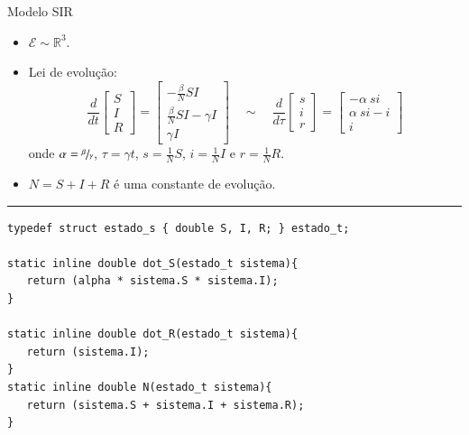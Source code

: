 \documentclass{beamer}
\begin{document}
\begin{frame}[fragile]{Modelo SIR}

   \begin{itemize}
      \item $\mathcal E \sim \mathbb R^3$.
      \item Lei de evolução:
      \begin{equation}
         \frac{d}{dt}
         \begin{bmatrix} S \\ I \\ R \end{bmatrix} =
         \begin{bmatrix}
            -\frac{\beta}{N} S I \\
            \frac{\beta}{N} S I - \gamma I \\
            \gamma I
         \end{bmatrix}
         \quad\sim\quad
         \frac{d}{d\tau}
         \begin{bmatrix} s \\ i \\ r \end{bmatrix} =
         \begin{bmatrix}
            -\alpha ~ s i \\
            \alpha ~ s i - i \\
            i
         \end{bmatrix}
      \end{equation}
      onde $\alpha = \sfrac{\beta}{\gamma}$,
      $\tau = \gamma t$,
      $s = \frac{1}{N} S$,
      $i = \frac{1}{N} I$ e
      $r = \frac{1}{N} R$.
      \item $N = S + I + R$ é uma constante de evolução.
   \end{itemize}

   \rule{\textwidth}{1pt}
   \scriptsize
\begin{lstlisting}[style = c]
typedef struct estado_s { double S, I, R; } estado_t;

static inline double dot_S(estado_t sistema){
   return (alpha * sistema.S * sistema.I);
}

static inline double dot_R(estado_t sistema){
   return (sistema.I);
}
static inline double N(estado_t sistema){
   return (sistema.S + sistema.I + sistema.R);
}
\end{lstlisting}

\end{frame}
\end{document}
